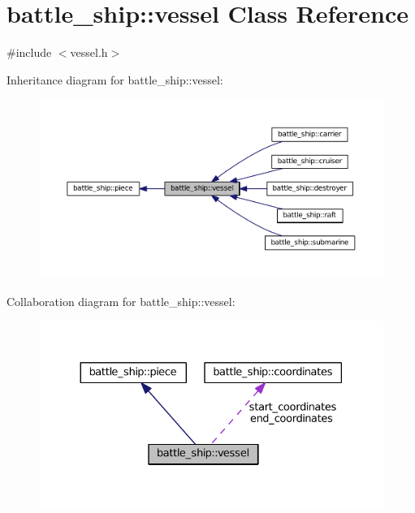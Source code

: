 \hypertarget{classbattle__ship_1_1vessel}{}\section{battle\+\_\+ship\+:\+:vessel Class Reference}
\label{classbattle__ship_1_1vessel}


{\ttfamily \#include $<$vessel.\+h$>$}



Inheritance diagram for battle\+\_\+ship\+:\+:vessel\+:
\nopagebreak
\begin{figure}[H]
\begin{center}
\leavevmode
\includegraphics[width=350pt]{classbattle__ship_1_1vessel__inherit__graph}
\end{center}
\end{figure}


Collaboration diagram for battle\+\_\+ship\+:\+:vessel\+:
\nopagebreak
\begin{figure}[H]
\begin{center}
\leavevmode
\includegraphics[width=330pt]{classbattle__ship_1_1vessel__coll__graph}
\end{center}
\end{figure}

